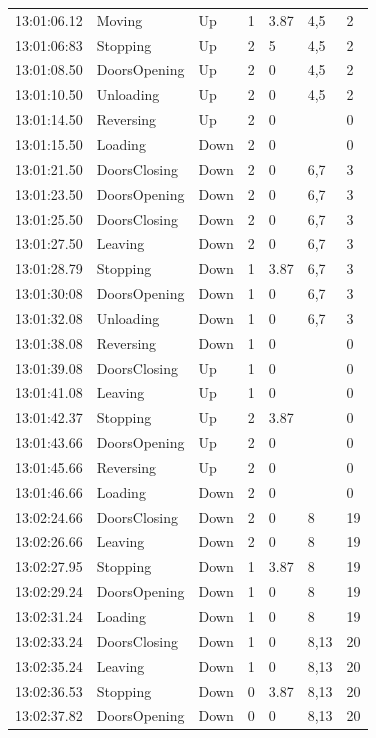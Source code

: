 \documentclass{UoYCSproject}
\begin{document}
\begin{longtable}{l | l | l | l | l | l | l}
	13:01:06.12 & Moving & Up & 1 & 3.87 & 4,5 & 2 \\
	13:01:06:83 & Stopping & Up & 2 & 5 & 4,5 & 2 \\
	13:01:08.50 & DoorsOpening & Up & 2 & 0 & 4,5 & 2 \\
	13:01:10.50 & Unloading & Up & 2 & 0 & 4,5 & 2 \\
	13:01:14.50 & Reversing & Up & 2 & 0 &  & 0 \\
	13:01:15.50 & Loading & Down & 2 & 0 &  & 0 \\
	13:01:21.50 & DoorsClosing & Down & 2 & 0 & 6,7 & 3 \\
	13:01:23.50 & DoorsOpening & Down & 2 & 0 & 6,7 & 3 \\
	13:01:25.50 & DoorsClosing & Down & 2 & 0 & 6,7 & 3 \\
	13:01:27.50 & Leaving & Down & 2 & 0 & 6,7 & 3 \\
	13:01:28.79 & Stopping & Down & 1 & 3.87 & 6,7 & 3 \\
	13:01:30:08 & DoorsOpening & Down & 1 & 0 & 6,7 & 3 \\
	13:01:32.08 & Unloading & Down & 1 & 0 & 6,7 & 3 \\
	13:01:38.08 & Reversing & Down & 1 & 0 &  & 0 \\
	13:01:39.08 & DoorsClosing & Up & 1 & 0 &  & 0 \\
	13:01:41.08 & Leaving & Up & 1 & 0 &  & 0 \\
	13:01:42.37 & Stopping & Up & 2 & 3.87 &  & 0 \\
	13:01:43.66 & DoorsOpening & Up & 2 & 0 &  & 0 \\
	13:01:45.66 & Reversing & Up & 2 & 0 &  & 0 \\
	13:01:46.66 & Loading & Down & 2 & 0 &  & 0 \\
	13:02:24.66 & DoorsClosing & Down & 2 & 0 & 8 & 19 \\
	13:02:26.66 & Leaving & Down & 2 & 0 & 8 & 19 \\
	13:02:27.95 & Stopping & Down & 1 & 3.87 & 8 & 19 \\
	13:02:29.24 & DoorsOpening & Down & 1 & 0 & 8 & 19 \\
	13:02:31.24 & Loading & Down & 1 & 0 & 8 & 19 \\
	13:02:33.24 & DoorsClosing & Down & 1 & 0 & 8,13 & 20 \\
	13:02:35.24 & Leaving & Down & 1 & 0 & 8,13 & 20 \\
	13:02:36.53 & Stopping & Down & 0 & 3.87 & 8,13 & 20 \\
	13:02:37.82 & DoorsOpening & Down & 0 & 0 & 8,13 & 20 \\

\end{longtable}
\end{document}
